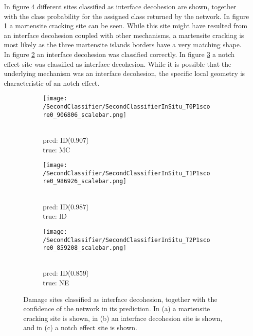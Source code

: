In figure \ref{fig:InSituInterfaceDecohesionSamples} different sites classified as interface decohesion are shown, together with the class probability for the assigned class returned by the network. In figure \ref{sub:InSituInterfaceDecohesionSamplesM} a martensite cracking site can be seen. While this site might have resulted from an interface decohesion coupled with other mechanisms, a martensite cracking is most likely as the three martensite islands borders have a very matching shape. In figure \ref{sub:InSituInterfaceDecohesionSamplesID} an interface decohesion was classified correctly. In figure \ref{sub:InSituInterfaceDecohesionSamplesN} a notch effect site was classified as interface decohesion. While it is possible that the underlying mechanism was an interface decohesion, the specific local geometry is characteristic of an notch effect.

\begin{figure}[H]
\centering
\begin{subfigure}{0.3\textwidth}
\texttt{[image: /SecondClassifier/SecondClassifierInSitu\_T0P1score0\_906806\_scalebar.png]}
\caption{\\pred: ID($0.907$) \\ true: MC}
\label{sub:InSituInterfaceDecohesionSamplesM}
\end{subfigure}
\begin{subfigure}{0.3\textwidth}
\texttt{[image: /SecondClassifier/SecondClassifierInSitu\_T1P1score0\_986926\_scalebar.png]}
\caption{\\pred: ID($0.987$) \\ true: ID}
\label{sub:InSituInterfaceDecohesionSamplesID}
\end{subfigure}
\begin{subfigure}{0.3\textwidth}
\texttt{[image: /SecondClassifier/SecondClassifierInSitu\_T2P1score0\_859208\_scalebar.png]}
\caption{\\pred: ID($0.859$) \\ true: NE}
\label{sub:InSituInterfaceDecohesionSamplesN}
\end{subfigure}
\caption{Damage sites classified as interface decohesion, together with the confidence of the network in its prediction. In (a) a martensite cracking site is shown, in (b) an interface decohesion site is shown, and in (c) a notch effect site is shown. }
\label{fig:InSituInterfaceDecohesionSamples}
\end{figure}

